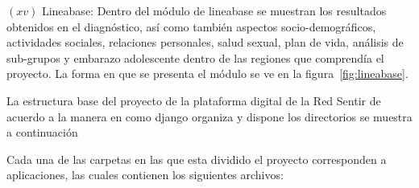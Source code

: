 \documentclass[journal,transmag]{IEEEtran}
\begin{document}
$(xv)$ Lineabase: Dentro del módulo de lineabase se muestran los resultados obtenidos en el diagnóstico, así como también aspectos socio-demográficos, actividades sociales, relaciones personales, salud sexual, plan de vida, análisis de sub-grupos y embarazo adolescente dentro de las regiones que comprendía el proyecto. La forma en que se presenta el módulo se ve en la figura~\ref{fig:lineabase}.

La estructura base del proyecto de la plataforma digital de la Red Sentir de acuerdo a la manera en como django organiza y dispone los directorios se muestra a continuación

\vspace{4mm}

Cada una de las carpetas en las que esta dividido el proyecto corresponden a aplicaciones, las cuales contienen los siguientes archivos:
\end{document}

